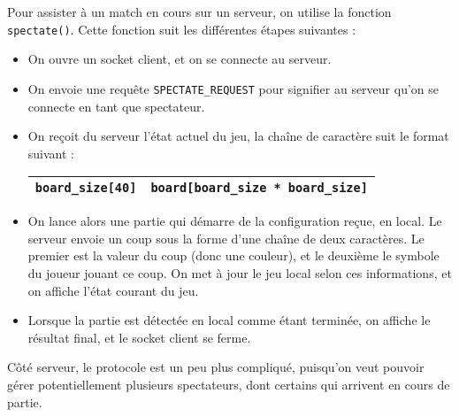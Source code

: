 \documentclass[a4paper]{article}
\begin{document}
Pour assister à un match en cours sur un serveur, on utilise la fonction \texttt{spectate()}. Cette fonction suit les différentes étapes suivantes :

%
\begin{itemize}
	\setlength\itemsep{0.5em}
	\item On ouvre un socket client, et on se connecte au serveur.
	\item On envoie une requête \texttt{SPECTATE\_REQUEST} pour signifier au serveur qu'on se connecte en tant que spectateur.
	\item On reçoit du serveur l'état actuel du jeu, la chaîne de caractère suit le format suivant :

		\bgroup
		\def\arraystretch{1.5}
		\begin{center}
		\begin{tabular}{|c|c|}
			\hline 
			\texttt{board\_size[40]} & \texttt{board[board\_size * board\_size]} \\ 
			\hline 
		\end{tabular} 	
		\end{center}
		\egroup
	
	\item On lance alors une partie qui démarre de la configuration reçue, en local. Le serveur envoie un coup sous la forme d'une chaîne de deux caractères. Le premier est la valeur du coup (donc une couleur), et le deuxième le symbole du joueur jouant ce coup. On met à jour le jeu local selon ces informations, et on affiche l'état courant du jeu. 
	\item Lorsque la partie est détectée en local comme étant terminée, on 
	affiche le résultat final, et le socket client se ferme. \\

\end{itemize}
%


\noindent Côté serveur, le protocole est un peu plus compliqué, puisqu'on veut pouvoir 
gérer potentiellement plusieurs spectateurs, dont certains qui arrivent en 
cours de partie. \\
\end{document}
